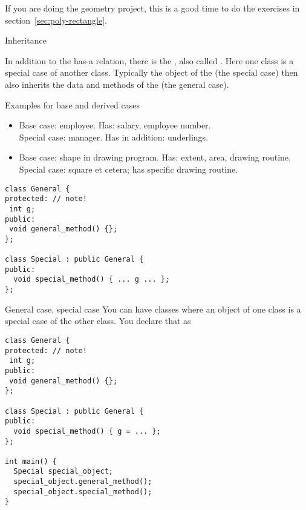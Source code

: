 \begin{exercise}
  If you are doing the geometry project, this is a good time to
  do the exercises in section~\ref{sec:poly-rectangle}.
\end{exercise}

 {Inheritance}
\label{sec:inheritance}

In addition to the has-a relation, there is the , also called . Here one class is
a special case of another class.
Typically the object of the  (the special
case) then also inherits the data and methods of the
 (the general case).

\begin{block}{Examples for base and derived cases}
  \label{sl:derived-example}
  \begin{itemize}
  \item Base case: employee. Has: salary, employee number.\\
    Special case: manager. Has in addition: underlings.
  \item Base case: shape in drawing program. Has: extent, area,
    drawing routine.\\
    Special case: square et cetera; has specific drawing routine.
  \end{itemize}  
\end{block}

\begin{lstlisting}
class General {
protected: // note!
 int g;
public:
 void general_method() {};
};

class Special : public General {
public:
  void special_method() { ... g ... };
};
\end{lstlisting}

\begin{slide}{General case, special case}
  \label{sl:obj-case}
  You can have classes where an object of one class is a special case of
  the other class. You declare that as
\begin{lstlisting}
class General {
protected: // note!
 int g;
public:
 void general_method() {};
};

class Special : public General {
public:
  void special_method() { g = ... };
};

int main() {
  Special special_object;
  special_object.general_method();
  special_object.special_method();
}
\end{lstlisting}
\end{slide}


